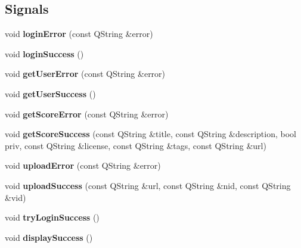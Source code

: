 \subsection*{Signals}
\begin{DoxyCompactItemize}
\item 
\mbox{\label{class_ms_1_1_login_manager_a57a100ffbcb5ee46017de14940b3a88e}} 
void {\bfseries login\+Error} (const Q\+String \&error)
\item 
\mbox{\label{class_ms_1_1_login_manager_af377bf6af313256c56a03f09d67b647c}} 
void {\bfseries login\+Success} ()
\item 
\mbox{\label{class_ms_1_1_login_manager_abef46c95c9dd56eb874de829f912e269}} 
void {\bfseries get\+User\+Error} (const Q\+String \&error)
\item 
\mbox{\label{class_ms_1_1_login_manager_a283d4d6fccbab21c9dadb0001534ea55}} 
void {\bfseries get\+User\+Success} ()
\item 
\mbox{\label{class_ms_1_1_login_manager_a7a8a9a6be140aee02c1fcabccf1fac09}} 
void {\bfseries get\+Score\+Error} (const Q\+String \&error)
\item 
\mbox{\label{class_ms_1_1_login_manager_a745c0ca4421cd2af5c4a07bfd53c3529}} 
void {\bfseries get\+Score\+Success} (const Q\+String \&title, const Q\+String \&description, bool priv, const Q\+String \&license, const Q\+String \&tags, const Q\+String \&url)
\item 
\mbox{\label{class_ms_1_1_login_manager_a2e9474ba377aaea373488031c98c18c8}} 
void {\bfseries upload\+Error} (const Q\+String \&error)
\item 
\mbox{\label{class_ms_1_1_login_manager_a354c60f59cde1dbd6b48f509dcf6162b}} 
void {\bfseries upload\+Success} (const Q\+String \&url, const Q\+String \&nid, const Q\+String \&vid)
\item 
\mbox{\label{class_ms_1_1_login_manager_a9d2b89a9ea79571b8a201095e1fc0da5}} 
void {\bfseries try\+Login\+Success} ()
\item 
\mbox{\label{class_ms_1_1_login_manager_aa1ae5618d6a52977e8827e26a0cb8a14}} 
void {\bfseries display\+Success} ()
\end{DoxyCompactItemize}
